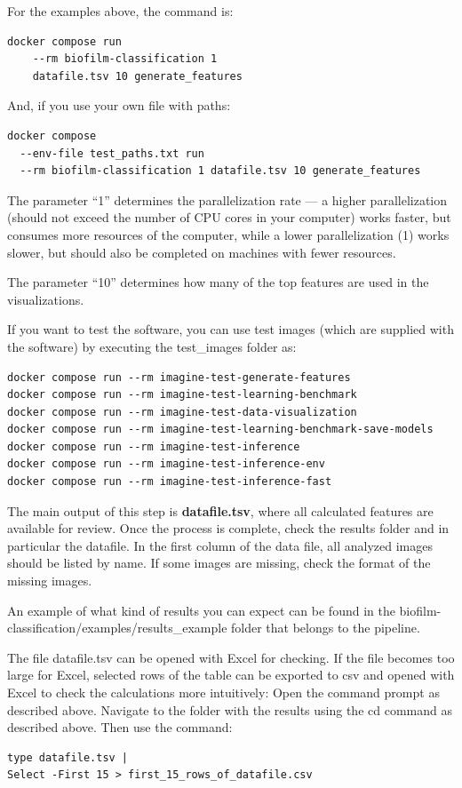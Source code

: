\documentclass{ol-softwaremanual}
\begin{document}
For the examples above, the command is:
\begin{verbatim}
docker compose run 
	--rm biofilm-classification 1 
	datafile.tsv 10 generate_features
\end{verbatim}


And, if you use your own file with paths:
\begin{verbatim}
docker compose 
  --env-file test_paths.txt run 
  --rm biofilm-classification 1 datafile.tsv 10 generate_features
\end{verbatim}

The parameter “1” determines the parallelization rate — a higher parallelization (should not exceed the number of CPU cores in your computer) works faster, but consumes more resources of the computer, while a lower parallelization (1) works slower, but should also be completed on machines with fewer resources.

The parameter “10” determines how many of the top features are used in the visualizations.

If you want to test the software, you can use test images (which are supplied with the software) by executing the test\_images folder as:
\begin{verbatim}
docker compose run --rm imagine-test-generate-features
docker compose run --rm imagine-test-learning-benchmark
docker compose run --rm imagine-test-data-visualization
docker compose run --rm imagine-test-learning-benchmark-save-models
docker compose run --rm imagine-test-inference
docker compose run --rm imagine-test-inference-env
docker compose run --rm imagine-test-inference-fast
\end{verbatim}


The main output of this step is \textbf{datafile.tsv}, where all calculated features are available for review.
Once the process is complete, check the results folder and in particular the datafile. 
In the first column of the data file, all analyzed images should be listed by name. If some images are missing, check the format of the missing images. 

An example of what kind of results you can expect can be found in the biofilm-classification/examples/results\_example folder that belongs to the pipeline.

The file datafile.tsv can be opened with Excel for checking. If the file becomes too large for Excel, selected rows of the table can be exported to csv and opened with Excel to check the calculations more intuitively:
Open the command prompt as described above. 
Navigate to the folder with the results using the cd command as described above. Then use the command:
\begin{verbatim}
type datafile.tsv | 
Select -First 15 > first_15_rows_of_datafile.csv
\end{verbatim}
\end{document}
